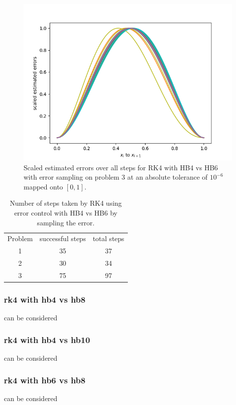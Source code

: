 \begin{figure}[H]
\centering
\includegraphics[width=0.7\linewidth]{./figures/rk4_with_hb4_hb6_sampling_p3_scaled_estimated_errors}
\caption{Scaled estimated errors over all steps for RK4 with HB4 vs HB6 with error sampling on problem 3 at an absolute tolerance of $10^{-6}$ mapped onto $[0, 1]$.}
\label{fig:rk4_with_hb4_hb6_sampling_p3_scaled_estimated_errors}
\end{figure}


\begin{table}[h]
\caption {Number of steps taken by RK4 using error control with HB4 vs HB6 by sampling the error.} \label{tab:rk4_with_hb4_hb6_sampling_nsteps}
\begin{center}
\begin{tabular}{ c c c } 
Problem & successful steps & total steps \\ 
1       & 35                         & 37 \\ 
2       & 30                         & 34 \\
3       & 75                         & 97 \\
\end{tabular}
\end{center}
\end{table}


\subsubsection{rk4 with hb4 vs hb8}
can be considered
\subsubsection{rk4 with hb4 vs hb10}
can be considered
\subsubsection{rk4 with hb6 vs hb8}
can be considered
